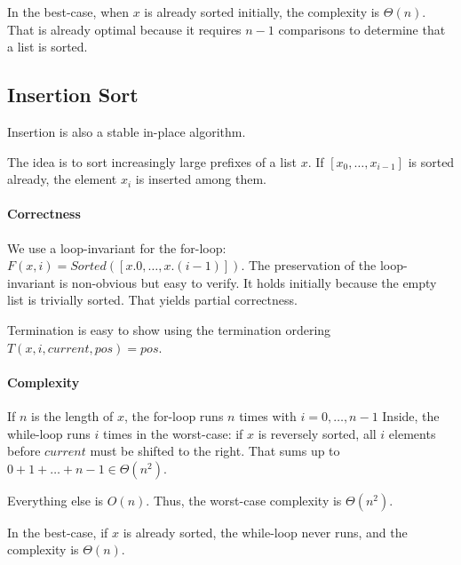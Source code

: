 In the best-case, when $x$ is already sorted initially, the complexity is $\Theta(n)$.
That is already optimal because it requires $n-1$ comparisons to determine that a list is sorted.

\subsection{Insertion Sort}

Insertion is also a stable in-place algorithm.

The idea is to sort increasingly large prefixes of a list $x$.
If $[x_0,\ldots,x_{i-1}]$ is sorted already, the element $x_i$ is inserted among them.

\begin{acode}
\end{acode}

\paragraph{Correctness}
We use a loop-invariant for the for-loop: $F(x,i)=Sorted([x.0,\ldots,x.(i-1)])$.
The preservation of the loop-invariant is non-obvious but easy to verify.
It holds initially because the empty list is trivially sorted.
That yields partial correctness.

Termination is easy to show using the termination ordering $T(x,i,current,pos)=pos$.

\paragraph{Complexity}
If $n$ is the length of $x$, the for-loop runs $n$ times with $i=0,\ldots,n-1$
Inside, the while-loop runs $i$ times in the worst-case: if $x$ is reversely sorted, all $i$ elements before $current$ must be shifted to the right.
That sums up to $0+1+\ldots+n-1\in \Theta(n^2)$.

Everything else is $O(n)$.
Thus, the worst-case complexity is $\Theta(n^2)$.

In the best-case, if $x$ is already sorted, the while-loop never runs, and the complexity is $\Theta(n)$.

